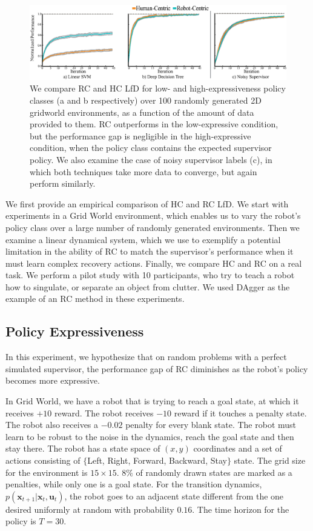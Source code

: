 \documentclass[10pt, conference]{ieeeconf}      %
\newcommand{\bu}{\mathbf{u}}
\newcommand{\bx}{\mathbf{x}}
\begin{document}
\begin{figure}
\includegraphics{f_figs/var_grid.eps}
\caption{
    \footnotesize
We compare RC and HC LfD for low- and high-expressiveness policy classes (a and b respectively) over 100 randomly generated 2D gridworld environments, as a function of the amount of data provided to them. RC outperforms in the low-expressive condition, but the performance gap is negligible in the high-expressive condition, when the policy class contains the expected supervisor policy. We also examine the case of noisy supervisor labels (c), in which both techniques take more data to converge, but again perform similarly. 
}
\vspace*{-20pt}
\label{fig:var}
\end{figure}

We first provide an empirical comparison of HC and RC LfD.
We start with experiments in a Grid World environment, which enables us to vary the robot's policy class over a large number of randomly generated environments. Then we examine a linear dynamical system, which we use to exemplify a potential limitation in the ability of RC to match the supervisor's performance when it must learn complex recovery actions.
Finally, we compare HC and RC on a real task. We perform a pilot study with 10 participants, who try to teach a robot how to singulate, or separate an object from clutter. We used DAgger as the example of an RC method in these experiments. 

\subsection{Policy Expressiveness}\label{sec:gdw}
In this experiment, we hypothesize that on random problems with a perfect simulated supervisor, the performance gap of RC diminishes as the robot's policy becomes more expressive. 

In Grid World, we have a robot that is trying to reach a goal state, at which it receives $+10$ reward. The robot receives $-10$ reward if it touches a penalty state. The robot also receives a $-0.02$ penalty for every blank state. The robot must learn to be robust to the noise in the dynamics, reach the goal state and then stay there.
The robot has a state space of $(x,y)$ coordinates and a set of actions consisting of $\lbrace$Left, Right, Forward, Backward, Stay$\rbrace$ state. The grid size for the environment is $15 \times 15$. $8\%$ of randomly drawn states are marked as a penalties, while only one is a goal state. For the transition dynamics, $p(\bx_{t+1}|\bx_{t},\bu_t)$, the robot goes to an adjacent state different from the one desired uniformly at random with probability $0.16$. The time horizon for the policy is $T=30$. 
\end{document}

